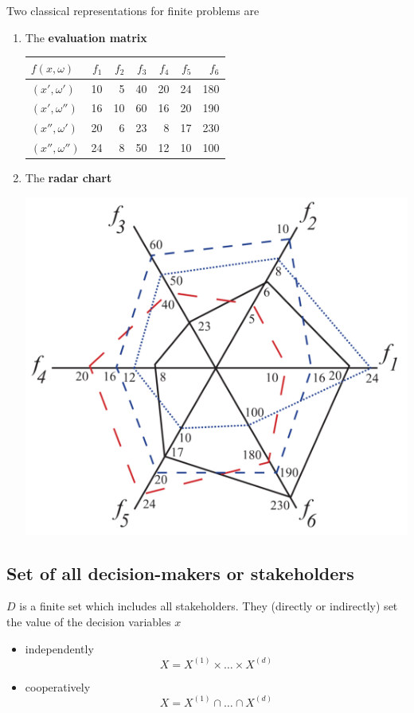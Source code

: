 Two classical representations for finite problems are 
\begin{enumerate}
	\item The \textbf{evaluation matrix}
	\begin{center}
		\begin{tabular}{@{}l|rrrrrr@{}}
			\toprule
			\(f(x,\omega)\) & \(f_1\) & \(f_2\) & \(f_3\) & \(f_4\) & \(f_5\) & \(f_6\) \\
			\midrule
			\((x',\omega')\)   & 10 &  5 & 40 & 20 & 24 & 180 \\
			\((x',\omega'')\)  & 16 & 10 & 60 & 16 & 20 & 190 \\
			\((x'',\omega')\)  & 20 &  6 & 23 &  8 & 17 & 230 \\
			\((x'',\omega'')\) & 24 &  8 & 50 & 12 & 10 & 100 \\
			\bottomrule
		\end{tabular}
	\end{center}
	
	\item The \textbf{radar chart}
	\begin{center}
		\includegraphics[width=0.45\columnwidth]{img/dp/fundamentaldefinitions/chart1}
	\end{center}
\end{enumerate}

\subsection{Set of all decision-makers or stakeholders}
\label{subsec:decisionmakersdef}

$D$ is a finite set which includes all stakeholders. They (directly or indirectly) set the value of the decision variables $x$
\begin{itemize}
	\item independently
	$$ X = X^{(1)} \times \dots \times X^{(d)} $$
	
	\item cooperatively
	$$ X = X^{(1)} \cap \dots \cap X^{(d)} $$
\end{itemize}

